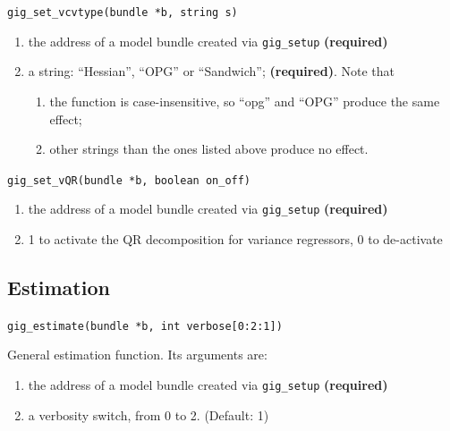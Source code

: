 \documentclass[a4paper,11pt]{article}
\newenvironment{funcdoc}[1]
{\noindent\hrulefill\newline\texttt{#1}\par\noindent\hrulefill\par\medskip\par}
{\bigskip}
\begin{document}
\begin{funcdoc}{gig\_set\_vcvtype(bundle *b, string s)}
\begin{enumerate}
\item the address of a model bundle created via \texttt{gig\_setup}
  \textbf{(required)}
\item  a string: ``Hessian'', ``OPG'' or ``Sandwich'';
  \textbf{(required)}. Note that
  \begin{enumerate}
  \item the function is case-insensitive, so ``opg'' and ``OPG''
    produce the same effect;
  \item other strings than the ones listed above produce no effect.
  \end{enumerate}
\end{enumerate}
\end{funcdoc}

\begin{funcdoc}{gig\_set\_vQR(bundle *b, boolean on\_off)}
\begin{enumerate}
\item the address of a model bundle created via \texttt{gig\_setup}
  \textbf{(required)}
\item 1 to activate the QR decomposition for variance regressors, 0 to
  de-activate
\end{enumerate}
\end{funcdoc}

\subsection{Estimation}
\label{sec:syntax_estim}

\begin{funcdoc}{gig\_estimate(bundle *b, int verbose[0:2:1])}

General estimation function. %
Its arguments are:
\begin{enumerate}
\item the address of a model bundle created via \texttt{gig\_setup}
  \textbf{(required)}
\item a verbosity switch, from 0 to 2. (Default: 1)
\end{enumerate}
\end{funcdoc}
\end{document}
